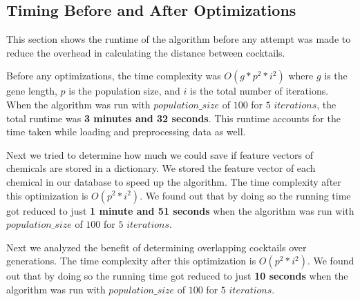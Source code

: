 \subsection{Timing Before and After Optimizations}


This section shows the runtime of the algorithm before any attempt was made to reduce the overhead in calculating the distance between cocktails.

Before any optimizations, the time complexity was $O ( g * p^2 * i^2 )$ where $g$ is the gene length, $p$ is the population size, and $i$ is the total number of iterations. 
When the algorithm was run with $population\_size$ of $100$ for $5$ $iterations$, the total runtime was \textbf{3 minutes and 32 seconds}. This runtime accounts for the time taken while loading and preprocessing data as well.



Next we tried to determine how much we could save if feature vectors of chemicals are stored in a dictionary. 
We stored the feature vector of each chemical in our database to speed up the algorithm. The time complexity after this optimization is $O ( p^2 * i^2 )$. We found out that by doing so the running time got reduced to just \textbf{1 minute and 51 seconds} when the algorithm was run with $population\_size$ of $100$ for $5$ $iterations$.


Next we analyzed the benefit of determining overlapping cocktails over generations.
The time complexity after this optimization is $O ( p^2 * i^2 )$. We found out that by doing so the running time got reduced to just \textbf{10 seconds} when the algorithm was run with $population\_size$ of $100$ for $5$ $iterations$.

